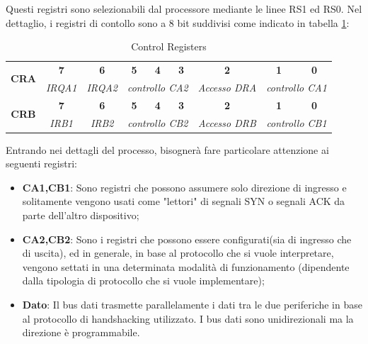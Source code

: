 Questi registri sono selezionabili dal processore mediante le linee RS1 ed RS0.
Nel dettaglio, i registri di contollo sono a 8 bit suddivisi come indicato in tabella \ref{Tab:control_registers}:

\begin{table}[!ht]
    \centering
    \renewcommand{\arraystretch}{1.5} %
    \setlength{\tabcolsep}{8pt} %
    \begin{tabular}{|c|c|c|c|c|c|c|c|c|}
        \hline
        \multirow{2}{*}{\textbf{CRA}} 
        & \textbf{7}  & \textbf{6}  & \textbf{5}  & \textbf{4}  & \textbf{3}  & \textbf{2}  & \textbf{1}  & \textbf{0}  \\ 
        \cline{2-9} 
        & \textit{IRQA1}  & \textit{IRQA2}  
        & \multicolumn{3}{c|}{\textit{controllo CA2}}  
        & \textit{Accesso DRA}  
        & \multicolumn{2}{c|}{\textit{controllo CA1}}  \\ 
        \hline
        \multirow{2}{*}{\textbf{CRB}}  
        & \textbf{7}  & \textbf{6}  & \textbf{5}  & \textbf{4}  & \textbf{3}  & \textbf{2}  & \textbf{1}  & \textbf{0}  \\ 
        \cline{2-9} 
        & \textit{IRB1}  & \textit{IRB2}  
        & \multicolumn{3}{c|}{\textit{controllo CB2}}  
        & \textit{Accesso DRB}  
        & \multicolumn{2}{c|}{\textit{controllo CB1}}  \\ 
        \hline
    \end{tabular}
    \caption{Control Registers}
    \label{Tab:control_registers}
\end{table}



Entrando nei dettagli del processo, bisognerà fare particolare attenzione ai seguenti registri:
\begin{itemize}
    \item \textbf{CA1,CB1}: Sono registri che possono assumere solo direzione di ingresso e solitamente vengono usati come "lettori" di segnali SYN o segnali ACK da parte dell'altro dispositivo;
    \item \textbf{CA2,CB2}: Sono i registri che possono essere configurati(sia di ingresso che di uscita), ed in generale, in base al protocollo che si vuole interpretare, vengono settati in una determinata modalità di funzionamento (dipendente dalla tipologia di protocollo che si vuole implementare);
    \item \textbf{Dato}: Il bus dati trasmette parallelamente i dati tra le due periferiche in base al protocollo di handshacking utilizzato. I bus dati sono unidirezionali ma la direzione è programmabile. 
\end{itemize}

